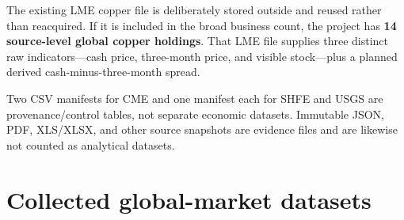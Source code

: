 \documentclass[11pt,a4paper]{article}
\newcommand{\code}[1]{\texttt{\detokenize{#1}}}
\begin{document}
The existing LME copper file is deliberately stored outside \code{global_market} and reused
rather than reacquired. If it is included in the broad business count, the project has
\textbf{14 source-level global copper holdings}. That LME file supplies three distinct raw
indicators---cash price, three-month price, and visible stock---plus a planned derived
cash-minus-three-month spread.

Two CSV manifests for CME and one manifest each for SHFE and USGS are provenance/control tables,
not separate economic datasets. Immutable JSON, PDF, XLS/XLSX, and other source snapshots are
evidence files and are likewise not counted as analytical datasets.

\section{Collected global-market datasets}
\end{document}
